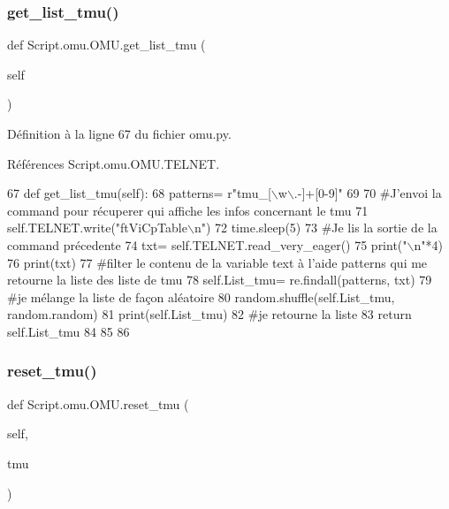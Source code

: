 \subsubsection{\texorpdfstring{get\+\_\+list\+\_\+tmu()}{get\_list\_tmu()}}
{\footnotesize\ttfamily def Script.\+omu.\+O\+M\+U.\+get\+\_\+list\+\_\+tmu (\begin{DoxyParamCaption}\item[{}]{self }\end{DoxyParamCaption})}



Définition à la ligne 67 du fichier omu.\+py.



Références Script.\+omu.\+O\+M\+U.\+T\+E\+L\+N\+ET.


\begin{DoxyCode}
67     \textcolor{keyword}{def }get\_list\_tmu(self):
68         patterns= \textcolor{stringliteral}{r"tmu\_[\(\backslash\)w\(\backslash\).-]+[0-9]"}
69 
70         \textcolor{comment}{#J'envoi la command pour récuperer qui affiche les infos concernant le tmu
}
71         self.TELNET.write(\textcolor{stringliteral}{"ftViCpTable\(\backslash\)n"})
72         time.sleep(5)
73         \textcolor{comment}{#Je lis la sortie de la command précedente 
}
74         txt= self.TELNET.read\_very\_eager()
75         print(\textcolor{stringliteral}{"\(\backslash\)n"}*4)
76         print(txt)
77         \textcolor{comment}{#filter le contenu de la variable text à l'aide patterns qui me retourne la liste des liste de tmu
}
78         self.List\_tmu= re.findall(patterns, txt)
79         \textcolor{comment}{#je mélange la liste de façon aléatoire
}
80         random.shuffle(self.List\_tmu, random.random)
81         print(self.List\_tmu)
82         \textcolor{comment}{#je retourne la liste
}
83         \textcolor{keywordflow}{return} self.List\_tmu
84 
85 
86 \end{DoxyCode}
\mbox{\label{classScript_1_1omu_1_1OMU_a563cfa14e4947945a078589e9fdde9ed}} 
\subsubsection{\texorpdfstring{reset\+\_\+tmu()}{reset\_tmu()}}
{\footnotesize\ttfamily def Script.\+omu.\+O\+M\+U.\+reset\+\_\+tmu (\begin{DoxyParamCaption}\item[{}]{self,  }\item[{}]{tmu }\end{DoxyParamCaption})}



